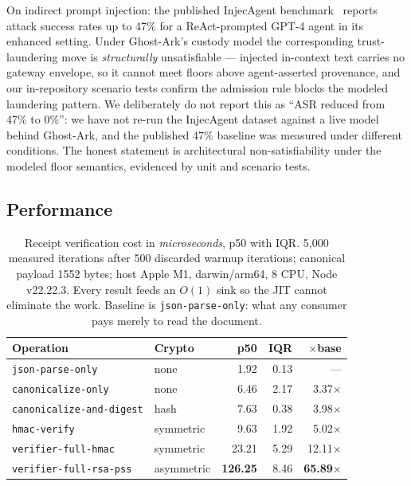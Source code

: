 \documentclass[10pt,twocolumn,letterpaper]{article}
\newcommand{\evtwoiters}{5{,}000}
\newcommand{\evtwohost}{Apple M1, darwin/arm64, 8 CPU, Node v22.22.3}
\newcommand{\evtwobasepfifty}{1.92}   %
\newcommand{\evtwobaseiqr}{0.13}      %
\newcommand{\evtwocanonpfifty}{6.46}  %
\newcommand{\evtwocanoniqr}{2.17}     %
\newcommand{\evtwocanonratio}{3.37}   %
\newcommand{\evtwodigestpfifty}{7.63} %
\newcommand{\evtwodigestiqr}{0.38}    %
\newcommand{\evtwodigestratio}{3.98}  %
\newcommand{\evtwohmaconlypfifty}{9.63} %
\newcommand{\evtwohmaconlyiqr}{1.92}    %
\newcommand{\evtwohmaconlyratio}{5.02}  %
\newcommand{\evtwohmacpfifty}{23.21}  %
\newcommand{\evtwohmaciqr}{5.29}      %
\newcommand{\evtwohmacratio}{12.11}   %
\newcommand{\evtworsapfifty}{126.25}  %
\newcommand{\evtworsaiqr}{8.46}       %
\newcommand{\evtworsaratio}{65.89}    %
\newcommand{\ghostark}{Ghost-Ark}
\begin{document}
On indirect prompt injection: the published InjecAgent
benchmark~\cite{zhan2024injecagent} reports attack success rates up to 47\%
for a ReAct-prompted GPT-4 agent in its enhanced setting. Under \ghostark{}'s
custody model the corresponding trust-laundering move is \emph{structurally}
unsatisfiable --- injected in-context text carries no gateway envelope, so it
cannot meet floors above agent-asserted provenance, and our in-repository
scenario tests confirm the admission rule blocks the modeled laundering
pattern. We deliberately do not report this as ``ASR reduced from 47\% to
0\%'': we have not re-run the InjecAgent dataset against a live model behind
\ghostark{}, and the published 47\% baseline was measured under different
conditions. The honest statement is architectural non-satisfiability under
the modeled floor semantics, evidenced by unit and scenario tests.

\subsection{Performance}
\label{sec:eval-perf}

\begin{table}[t]
\centering\small
\begin{tabular}{@{}llrrr@{}}
\toprule
\textbf{Operation} & \textbf{Crypto} & \textbf{p50} & \textbf{IQR} &
\textbf{$\times$base}\\
\midrule
\texttt{json-parse-only}          & none       & \evtwobasepfifty{}   & \evtwobaseiqr{}    & ---\\
\texttt{canonicalize-only}        & none       & \evtwocanonpfifty{}  & \evtwocanoniqr{}   & \evtwocanonratio{}$\times$\\
\texttt{canonicalize-and-digest}  & hash       & \evtwodigestpfifty{} & \evtwodigestiqr{}  & \evtwodigestratio{}$\times$\\
\texttt{hmac-verify}              & symmetric  & \evtwohmaconlypfifty{} & \evtwohmaconlyiqr{} & \evtwohmaconlyratio{}$\times$\\
\texttt{verifier-full-hmac}       & symmetric  & \evtwohmacpfifty{}   & \evtwohmaciqr{}    & \evtwohmacratio{}$\times$\\
\texttt{verifier-full-rsa-pss}    & asymmetric & \textbf{\evtworsapfifty{}} & \evtworsaiqr{} & \textbf{\evtworsaratio{}$\times$}\\
\bottomrule
\end{tabular}
\caption{Receipt verification cost in \emph{microseconds}, p50 with IQR.
\evtwoiters{} measured iterations after 500 discarded warmup iterations;
canonical payload 1552 bytes; host \evtwohost{}. Every result feeds an $O(1)$
sink so the JIT cannot eliminate the work. Baseline is
\texttt{json-parse-only}: what any consumer pays merely to read the document.}
\label{tab:perf}
\end{table}
\end{document}
